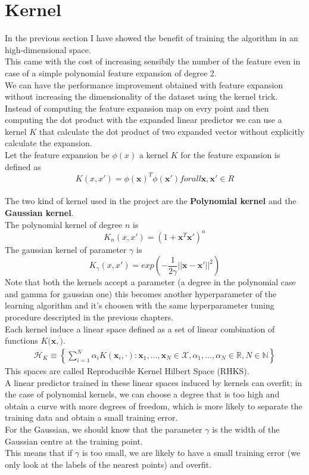 \newpage
\section{Kernel}
In the previous section I have showed the benefit of training the algorithm in an high-dimensional space.\\
This came with the cost of increasing sensibily the number of the feature even in case of a simple polynomial feature expansion of degree 2.\\
We can have the performance improvement obtained with feature expansion without increasing the dimensionality of the dataset using the kernel trick.\\
Instead of computing the feature expansion map on evry point and then computing the dot product with the expanded linear predictor we can use a kernel $K$ that calculate the dot product of two expanded vector without explicitly calculate the expansion.\\
Let the feature expansion be $\phi(x)$ a kernel $K$ for the feature expansion is defined as $$K(x, x') = \phi(\boldsymbol{x})^T \phi(\boldsymbol{x'})  for all \boldsymbol{x}, \boldsymbol{x'} \in R$$\\
The two kind of kernel used in the project are the \textbf{Polynomial kernel} and the \textbf{Gaussian kernel}.\\
The polynomial kernel of degree $n$ is $$K_n(x, x') = (1 + \boldsymbol{x}^T \boldsymbol{x'})^n$$
The gaussian kernel of parameter $\gamma$ is $$K_\gamma(x, x') = exp(-\frac{1}{2\gamma}||\boldsymbol{x} - \boldsymbol{x'}||^2)$$
Note that both the kernels accept a parameter (a degree in the polynomial case and gamma for gaussian one) this becomes another hyperparameter of the learning algorithm
and it's choosen with the same hyperparameter tuning procedure descripted in the previous chapters.\\ 
Each kernel induce a linear space defined as a set of linear combination of functions $K(\boldsymbol{x}, \dot)$.\\
\begin{align*}
    \mathcal{H}_K \equiv \left\{ \sum_{i=1}^N \alpha_i K(\boldsymbol{x}_i, \cdot) : \boldsymbol{x}_1, \dots, \boldsymbol{x}_N \in \mathcal{X}, \alpha_1, \dots, \alpha_N \in \mathbb{R}, N \in \mathbb{N} \right\}
\end{align*}
This spaces are called Reproducible Kernel Hilbert Space (RHKS).\\
A linear predictor trained in these linear spaces induced by kernels can overfit; in the case of polynomial kernels, we can choose a degree that is too high and obtain a curve with more degrees of freedom, which is more likely to separate the training data and obtain a small training error.\\
For the Gaussian, we should know that the parameter $\gamma$ is the width of the Gaussian centre at the training point.\\
This means that if $\gamma$ is too small, we are likely to have a small training error (we only look at the labels of the nearest points) and overfit.\\



